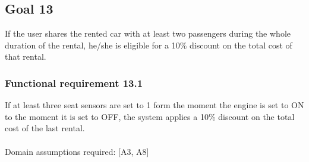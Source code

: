 \subsection{Goal 13}
If the user shares the rented car with at least two passengers during the whole duration of the rental, he/she is eligible for a 10\% discount on the total cost of that rental.

\setcounter{secnumdepth}{3}
\subsubsection{Functional requirement 13.1}
If at least three seat sensors are set to 1 form the moment the engine is set to ON to the moment it is set to OFF, the system applies a 10\% discount on the total cost of the last rental.\\~\\
\noindent Domain assumptions required: [A3, A8]